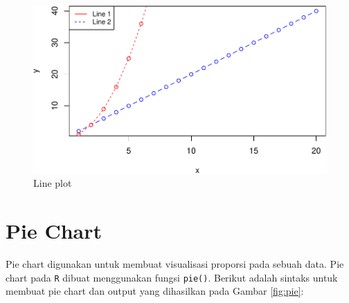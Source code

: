\documentclass[]{book}
\newenvironment{Shaded}{\begin{snugshade}}{\end{snugshade}}
\newcommand{\KeywordTok}[1]{\textcolor[rgb]{0.13,0.29,0.53}{\textbf{#1}}}
\newcommand{\DataTypeTok}[1]{\textcolor[rgb]{0.13,0.29,0.53}{#1}}
\newcommand{\DecValTok}[1]{\textcolor[rgb]{0.00,0.00,0.81}{#1}}
\newcommand{\StringTok}[1]{\textcolor[rgb]{0.31,0.60,0.02}{#1}}
\newcommand{\OtherTok}[1]{\textcolor[rgb]{0.56,0.35,0.01}{#1}}
\newcommand{\OperatorTok}[1]{\textcolor[rgb]{0.81,0.36,0.00}{\textbf{#1}}}
\newcommand{\NormalTok}[1]{#1}
\begin{document}
\begin{figure}

{\centering \includegraphics[width=0.7\linewidth]{EnvStat_files/figure-latex/line-1} 

}

\caption{Line plot}\label{fig:line}
\end{figure}

\section{Pie Chart}\label{pie-chart}

Pie chart digunakan untuk membuat visualisasi proporsi pada sebuah data.
Pie chart pada \texttt{R} dibuat menggunakan fungsi \texttt{pie()}.
Berikut adalah sintaks untuk membuat pie chart dan output yang
dihasilkan pada Gambar \ref{fig:pie}:

\begin{Shaded}
\end{Shaded}
\end{document}
